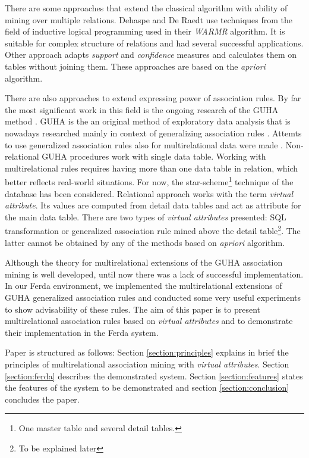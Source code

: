 \documentclass[conference]{IEEEtran}
\begin{document}
There are some approaches that extend the classical algorithm with ability
of mining over multiple relations. Dehaspe and De Raedt\cite{Warmr} use 
techniques from the field of inductive logical programming used in their 
\emph{WARMR} algorithm. It is suitable for complex structure of relations 
and had several successful applications. Other approach \cite{Connection}
adapts \emph{support} and \emph{confidence} measures and calculates them on
tables without joining them. These approaches are based on the \emph{apriori}
algorithm.

There are also approaches to extend expressing power of association rules.
By far the most significant work in this field is the ongoing research of
the GUHA method \cite{GUHA1, GUHA2}. GUHA is the an original method of 
exploratory data analysis that is nowadays researched mainly in context of
generalizing association rules \cite{Rauch2, Alternative}. Attemts to
use generalized association rules also for multirelational data were made
\cite{Rauch1, Karban}. 
Non-relational GUHA procedures work with single data table. 
Working with multirelational rules requires having more than one data table
in relation, which better reflects real-world situations.
For now, the star-scheme\footnote{One master table and several detail tables.}
technique of the database has been considered.
Relational approach works with the term \emph{virtual attribute}.
Its values are computed from detail data tables and act as attribute for the main
data table. There are two types of 
\emph{virtual attributes} presented: SQL transformation or generalized
association rule mined above the detail table\footnote{To be explained
later}. The latter cannot be obtained by any of the methods based on 
\emph{apriori} algorithm. 

Although the theory for multirelational extensions of the GUHA association
mining is well developed, until now there was a lack of successful 
implementation. In our Ferda environment, we implemented the multirelational
extensions of GUHA generalized association rules and conducted some very
useful experiments to show advisability of these rules. The aim of this paper
is to present multirelational association rules based on \emph{virtual attributes}
and to demonstrate their implementation in the Ferda system. 

Paper is structured as follows: Section \ref{section:principles} explains in brief
the principles of multirelational association mining with \emph{virtual attributes}.
Section \ref{section:ferda} describes the demonstrated system. Section 
\ref{section:features} states the features of the system to be demonstrated
and section \ref{section:conclusion} concludes the paper. 
\end{document}

